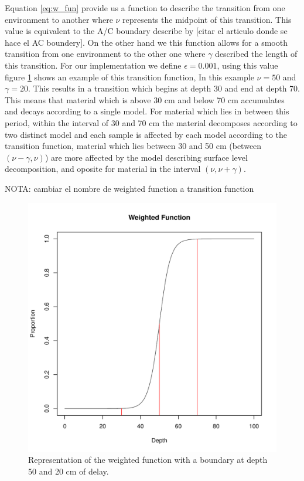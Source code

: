 \documentclass [10pt] {article}
\begin{document}
Equation \ref{eq:w_fun} provide us a function to describe the transition from one environment to another where $\nu$ represents the midpoint of this transition. This value is equivalent to the A/C boundary describe by [citar el articulo donde se hace el AC boundery]. On the other hand we this function allows for a smooth transition from one environment to the other one where $\gamma$ described the length of this transition. 
For our implementation we define $\epsilon=0.001$, using this value figure \ref{fig:w_function} shows an example of this transition function, In this example $\nu=50$ and $\gamma = 20$. This results in a transition which begins at depth 30 and end at depth 70. This means that material which is above 30 cm and below 70 cm accumulates and decays according to a single model. For material which lies in between this period, within the interval of 30 and 70 cm the material decomposes according to two distinct model and each sample is affected by each model according to the transition function, material which lies between 30 and 50 cm (between $(\nu-\gamma, \nu)$) are more affected by the model describing surface level decomposition, and oposite for material in the interval $(\nu,\nu +\gamma)$.


NOTA: cambiar el nombre de weighted function a transition function


\begin{figure}[!]
	\begin{centering}
		\includegraphics{weighted_fun.pdf}
		\caption{Representation of the weighted function with a boundary at depth 50 and 20 cm of delay.}
		\label{fig:w_function}
	\end{centering}
\end{figure}
\end{document}
